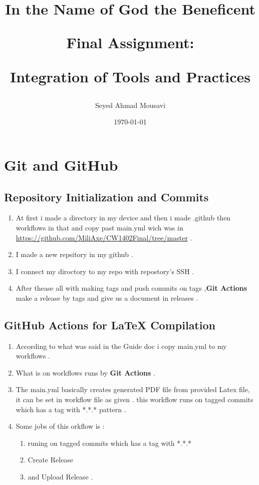 \documentclass{article}
\begin{document}
\begin{titlepage}
\title{
\textbf{In the Name of God the Beneficent}\par
    \vspace{2in}
\textbf{Final Assignment:}\par
\textbf{Integration of Tools and Practices}\par
    \vspace{2in}
}
\author{Seyed Ahmad Mousavi}
\date{\today}
\maketitle
\thispagestyle{empty}
\end{titlepage}
\newpage
\tableofcontents
{}
\fancyfoot[C]{}
\newpage
\section{Git and GitHub}
\subsection{Repository Initialization and Commits}
\begin{enumerate}
    \item {At first i made a directory in my device and then i made .github then workflows in that and copy past main.yml wich was in \url{https://github.com/MiliAxe/CW1402Final/tree/master} .}
    \item {I made a new repsitory in my github .}
    \item {I connect my diroctory to my repo with repostory's SSH .}
    \item {After thease all with making tags and push commits on tags ,\textbf{Git Actions} make a release by tags and give us a document in releases .}
\end{enumerate}
\subsection{GitHub Actions for LaTeX Compilation}
\begin{enumerate}
    \item {According to what was said in the Guide doc i copy main.yml to my workflows .}
    \item {What is on workflows runs by \textbf{Git Actions} .}
    \item {The main.yml basically creates generated PDF file from provided Latex file, it can be set in workflow file as given . this workflow runs on tagged commits which has a tag with *.*.* pattern .}
    \item {Some jobs of this orkflow is :}
    	\begin{enumerate}
    		\item{ runing on tagged commits which has a tag with *.*.* }
    		\item{Create Release }
    		\item{ and Upload Release .}
    	\end{enumerate}
\end{enumerate}
\end{document}
